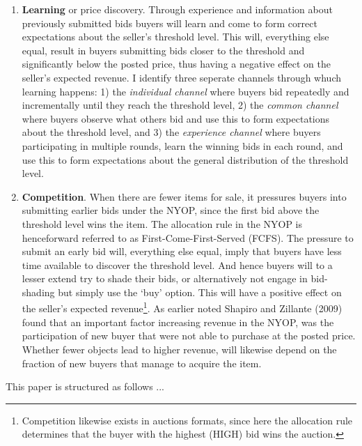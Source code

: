 \documentclass[a4paper,12pt]{article}
\begin{document}
	\begin{enumerate}
		\item {\bf Learning} or price discovery. Through experience and information about previously submitted bids buyers will learn and come to form correct expectations about the seller's threshold level. This will, everything else equal, result in buyers submitting bids closer to the threshold and significantly below the posted price, thus having a negative effect on the seller's expected revenue. I identify three seperate channels through whuch learning happens: 1) the \emph{individual channel} where buyers bid repeatedly and incrementally until they reach the threshold level, 2) the \emph{common channel} where buyers observe what others bid and use this to form expectations about the threshold level, and 3) the \emph{experience channel} where buyers participating in multiple rounds, learn the winning bids in each round, and use this to form expectations about the general distribution of the threshold level.
	 	\item {\bf Competition}. When there are fewer items for sale, it pressures buyers into submitting earlier bids under the NYOP, since the first bid above the threshold level wins the item. The allocation rule in the NYOP is henceforward referred to as First-Come-First-Served (FCFS). The pressure to submit an early bid will, everything else equal, imply that buyers have less time available to discover the threshold level. And hence buyers will to a lesser extend try to shade their bids, or alternatively not engage in bid-shading but simply use the `buy' option. This will have a positive effect on the seller's expected revenue\footnote{Competition likewise exists in auctions formats, since here the allocation rule determines that the buyer with the highest (HIGH) bid wins the auction.}. As earlier noted Shapiro and Zillante (2009) found that an important factor increasing revenue in the NYOP, was the participation of new buyer that were not able to purchase at the posted price. Whether fewer objects lead to higher revenue, will likewise depend on the fraction of new buyers that manage to acquire the item.
	\end{enumerate}

	This paper is structured as follows ... 

\end{document}
